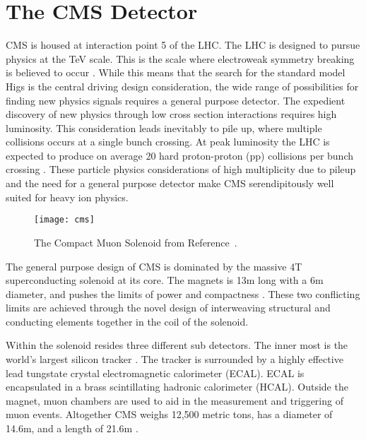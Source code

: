 \chapter{The CMS Detector}	
CMS is housed at interaction point 5 of the LHC. 
The LHC is designed to pursue physics at the TeV scale. 
This is the scale where electroweak symmetry breaking is believed to occur
	\cite{CmsPTdrv2}.
While this means that the search for the standard model Higs is the central 
	driving design consideration, the wide range of possibilities for
	finding new physics signals requires a general purpose detector.
The expedient discovery of new physics through low cross section interactions 
	requires high luminosity.
This consideration leads inevitably to pile up, where multiple collisions 
	occurs at a single bunch crossing.
At peak luminosity the LHC is expected to produce on average 20 hard 
	proton-proton (pp) collisions per bunch crossing \cite{tCmsE}.
These particle physics considerations of high multiplicity due to pileup and the
	need for a general purpose detector make CMS serendipitously well suited
	for heavy ion physics.
\begin{figure}[h]
  \centering
    \texttt{[image: cms]}
  \caption{The Compact Muon Solenoid from Reference~\cite{tCmsE}.}
  \label{cms}
\end{figure}

The general purpose design of CMS is dominated by the massive 4T 
	superconducting solenoid at its core.
The magnets is 13m long with a 6m diameter, and pushes the limits of power
	and compactness \cite{tCmsE}. 
These two conflicting limits are achieved through the novel design of 
	interweaving structural and conducting elements together in the coil of
	the solenoid.

Within the solenoid resides three different sub detectors.
The inner most is the world's largest silicon tracker \cite{tCmsE}.
The tracker is surrounded by a highly effective lead tungstate crystal 
	electromagnetic calorimeter (ECAL).
ECAL is encapsulated in a brass scintillating hadronic calorimeter (HCAL).
Outside the magnet, muon chambers are used to aid in the measurement and 
	triggering of muon events. 
Altogether CMS weighs 12,500 metric tons, has a diameter of 14.6m,
	and a length of 21.6m \cite{tCmsE}.

